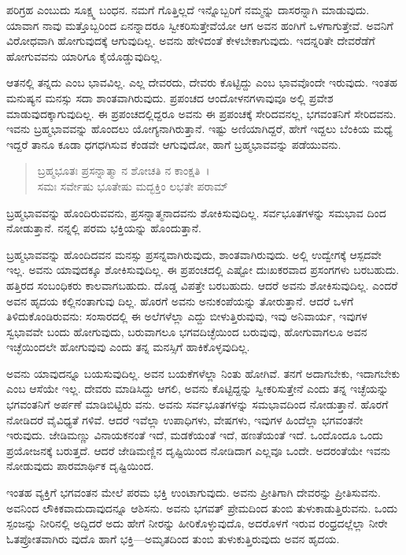 ಪರಿಗ್ರಹ ಎಂಬುದು ಸೂಕ್ಷ್ಮ ಬಂಧನ. ನಮಗೆ ಗೊತ್ತಿಲ್ಲದೆ ಇನ್ನೊಬ್ಬರಿಗೆ ನಮ್ಮನ್ನು ದಾಸರನ್ನಾಗಿ ಮಾಡುವುದು. ಯಾವಾಗ ನಾವು ಮತ್ತೊಬ್ಬರಿಂದ ಏನನ್ನಾದರೂ ಸ್ವೀಕರಿಸುತ್ತೇವೆಯೋ ಆಗ ಅವನ ಹಂಗಿಗೆ ಒಳಗಾಗುತ್ತೇವೆ. ಅವನಿಗೆ ವಿರೋಧವಾಗಿ ಹೋಗುವುದಕ್ಕೆ ಆಗುವುದಿಲ್ಲ. ಅವನು ಹೇಳಿದಂತೆ ಕೇಳಬೇಕಾಗುವುದು. ಇದನ್ನರಿತೇ ದೇವರೆಡೆಗೆ ಹೋಗುವವನು ಯಾರಿಗೂ ಕೈಯೊಡ್ಡುವುದಿಲ್ಲ.

ಆತನಲ್ಲಿ ತನ್ನದು ಎಂಬ ಭಾವವಿಲ್ಲ. ಎಲ್ಲ ದೇವರದು, ದೇವರು ಕೊಟ್ಟಿದ್ದು ಎಂಬ ಭಾವವೊಂದೇ ಇರುವುದು. ಇಂತಹ ಮನುಷ್ಯನ ಮನಸ್ಸು ಸದಾ ಶಾಂತವಾಗಿರುವುದು. ಪ್ರಪಂಚದ ಆಂದೋಳನಗಳಾವುವೂ ಅಲ್ಲಿ ಪ್ರವೇಶ ಮಾಡುವುದಕ್ಕಾಗುವುದಿಲ್ಲ. ಈ ಪ್ರಪಂಚದಲ್ಲಿದ್ದರೂ ಅವನು ಈ ಪ್ರಪಂಚಕ್ಕೆ ಸೇರಿದವನಲ್ಲ, ಭಗವಂತನಿಗೆ ಸೇರಿದವನು. ಇವನು ಬ್ರಹ್ಮಭಾವವನ್ನು ಹೊಂದಲು ಯೋಗ್ಯನಾಗಿರುತ್ತಾನೆ. ಇಷ್ಟು ಅಣಿಯಾಗಿದ್ದರೆ, ಹೇಗೆ ಇದ್ದಲು ಬೆಂಕಿಯ ಮಧ್ಯೆ ಇದ್ದರೆ ತಾನೂ ಕೂಡಾ ಧಗಧಗಿಸುವ ಕೆಂಡವೇ ಆಗುವುದೋ, ಹಾಗೆ ಬ್ರಹ್ಮಭಾವವನ್ನು ಪಡೆಯುವನು.

\begin{verse}
ಬ್ರಹ್ಮಭೂತಃ ಪ್ರಸನ್ನಾತ್ಮಾ ನ ಶೋಚತಿ ನ ಕಾಂಕ್ಷತಿ~।\\ಸಮಃ ಸರ್ವೇಷು ಭೂತೇಷು ಮದ್ಭಕ್ತಿಂ ಲಭತೇ ಪರಾಮ್ 
\end{verse}

{\small ಬ್ರಹ್ಮಭಾವವನ್ನು ಹೊಂದಿರುವವನು, ಪ್ರಸನ್ನಾತ್ಮನಾದವನು ಶೋಕಿಸುವುದಿಲ್ಲ. ಸರ್ವಭೂತಗಳನ್ನು ಸಮಭಾವ ದಿಂದ ನೋಡುತ್ತಾನೆ. ನನ್ನಲ್ಲಿ ಪರಮ ಭಕ್ತಿಯನ್ನು ಹೊಂದುತ್ತಾನೆ.}

ಬ್ರಹ್ಮಭಾವವನ್ನು ಹೊಂದಿದವನ ಮನಸ್ಸು ಪ್ರಸನ್ನವಾಗಿರುವುದು, ಶಾಂತವಾಗಿರುವುದು. ಅಲ್ಲಿ ಉದ್ವೇಗಕ್ಕೆ ಆಸ್ಪದವೇ ಇಲ್ಲ. ಅವನು ಯಾವುದಕ್ಕೂ ಶೋಕಿಸುವುದಿಲ್ಲ. ಈ ಪ್ರಪಂಚದಲ್ಲಿ ಎಷ್ಟೋ ದುಃಖಕರವಾದ ಪ್ರಸಂಗಗಳು ಬರಬಹುದು. ಹತ್ತಿರದ ಸಂಬಂಧಿಕರು ಕಾಲವಾಗಬಹುದು. ದೊಡ್ಡ ವಿಪತ್ತೇ ಬರಬಹುದು. ಆದರೆ ಅವನು ಶೋಕಿಸುವುದಿಲ್ಲ. ಎಂದರೆ ಅವನ ಹೃದಯ ಕಲ್ಲಿನಂತಾಗುವು ದಿಲ್ಲ. ಹೊರಗೆ ಅವನು ಅನುಕಂಪೆಯನ್ನು ತೋರುತ್ತಾನೆ. ಆದರೆ ಒಳಗೆ ತಿಳಿದುಕೊಂಡಿರುವನು: ಸಂಸಾರದಲ್ಲಿ ಈ ಅಲೆಗಳೆಲ್ಲಾ ಎದ್ದು ಬೀಳುತ್ತಿರುವುವು, ಇವು ಅನಿವಾರ್ಯ, ಇವುಗಳ ಸ್ವಭಾವವೇ ಬಂದು ಹೋಗುವುದು, ಬರುವಾಗಲೂ ಭಗವದಿಚ್ಛೆಯಿಂದ ಬರುವುವು, ಹೋಗುವಾಗಲೂ ಅವನ ಇಚ್ಛೆಯಿಂದಲೇ ಹೋಗುವುವು ಎಂದು ತನ್ನ ಮನಸ್ಸಿಗೆ ಹಾಕಿಕೊಳ್ಳವುದಿಲ್ಲ.

ಅವನು ಯಾವುದನ್ನೂ ಬಯಸುವುದಿಲ್ಲ. ಅವನ ಬಯಕೆಗಳೆಲ್ಲಾ ನಿಂತು ಹೋಗಿವೆ. ತನಗೆ ಅದಾಗಬೇಕು, ಇದಾಗಬೇಕು ಎಂಬ ಆಸೆಯೇ ಇಲ್ಲ. ದೇವರು ಮಾಡಿಸಿದ್ದು ಆಗಲಿ, ಅವನು ಕೊಟ್ಟಿದ್ದನ್ನು ಸ್ವೀಕರಿಸುತ್ತೇನೆ ಎಂದು ತನ್ನ ಇಚ್ಛೆಯನ್ನು ಭಗವಂತನಿಗೆ ಅರ್ಪಣೆ ಮಾಡಿಬಿಟ್ಟಿರು ವನು. ಅವನು ಸರ್ವಭೂತಗಳನ್ನು ಸಮಭಾವದಿಂದ ನೋಡುತ್ತಾನೆ. ಹೊರಗೆ ನೋಡಿದರೆ ವೈವಿಧ್ಯತೆ ಗಳಿವೆ. ಆದರೆ ಇವೆಲ್ಲಾ ಉಪಾಧಿಗಳು, ವೇಷಗಳು, ಇವುಗಳ ಹಿಂದೆಲ್ಲಾ ಭಗವಂತನೇ ಇರುವುದು. ಜೇಡಿಮಣ್ಣು ವಿನಾಯಕನಂತೆ ಇದೆ, ಮಡಕೆಯಂತೆ ಇದೆ, ಹಣತೆಯಂತೆ ಇದೆ. ಒಂದೊಂದೂ ಒಂದು ಪ್ರಯೋಜನಕ್ಕೆ ಬರುತ್ತದೆ. ಆದರೆ ಜೇಡಿಮಣ್ಣಿನ ದೃಷ್ಟಿಯಿಂದ ನೋಡಿದಾಗ ಎಲ್ಲವೂ ಒಂದೇ. ಅದರಂತೆಯೇ ಇವನು ನೋಡುವುದು ಪಾರಮಾರ್ಥಿಕ ದೃಷ್ಟಿಯಿಂದ.

ಇಂತಹ ವ್ಯಕ್ತಿಗೆ ಭಗವಂತನ ಮೇಲೆ ಪರಮ ಭಕ್ತಿ ಉಂಟಾಗುವುದು. ಅವನು ಪ್ರೀತಿಗಾಗಿ ದೇವರನ್ನು ಪ್ರೀತಿಸುವನು. ಅವನಿಂದ ಲೌಕಿಕವಾದುದಾವುದನ್ನೂ ಆಶಿಸನು. ಅವನು ಭಗವತ್ ಪ್ರೇಮದಿಂದ ತುಂಬಿ ತುಳುಕಾಡುತ್ತಿರುವನು. ಒಂದು ಸ್ಪಂಜನ್ನು ನೀರಿನಲ್ಲಿ ಅದ್ದಿದರೆ ಅದು ಹೇಗೆ ನೀರನ್ನು ಹೀರಿಕೊಳ್ಳುವುದೊ, ಅದರೊಳಗೆ ಇರುವ ರಂಧ್ರದಲ್ಲೆಲ್ಲಾ ನೀರೇ ಓತಪ್ರೋತವಾಗಿರು ವುದೊ ಹಾಗೆ ಭಕ್ತಿ—ಅಮೃತದಿಂದ ತುಂಬಿ ತುಳುಕುತ್ತಿರುವುದು ಅವನ ಹೃದಯ.

